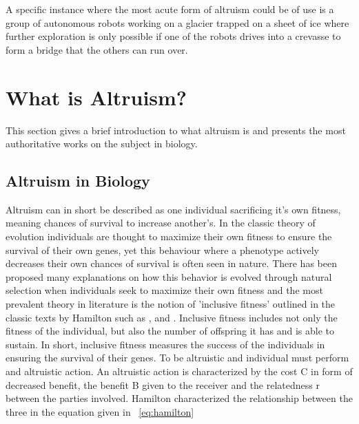 \documentclass[a4paper]{book}
\begin{document}
  
A specific instance where the most acute form of altruism could be of use is a group of autonomous robots working on a  glacier trapped on a sheet of ice where further exploration is only possible if one of the robots drives into a crevasse to form a bridge that the others can run over.    


\section{What is Altruism?}\label{cit}
\label{sec:BackgroundAndMotivation}
This section gives a brief introduction to what altruism is and presents the most authoritative works on the subject in biology.

\subsection{Altruism in Biology}

Altruism can in short be described as one individual sacrificing it's own fitness, meaning chances of survival to increase another's.
In the classic theory of evolution individuals are thought to maximize their own fitness to ensure the survival of their own genes, yet this behaviour where a phenotype actively decreases their own chances of survival is often seen in nature.
There has been proposed many explanations on how this behavior is evolved through natural selection when individuals seek to maximize their own fitness and the most prevalent theory in literature is the notion of 'inclusive fitness' outlined in the classic texts by Hamilton such as \cite{w._d._hamilton_evolution_1963}, \cite{hamilton_genetical_1964-1} and \cite{hamilton_genetical_1964}.
Inclusive fitness includes not only the fitness of the individual, but also the number of offspring it has and is able to sustain. In short, inclusive fitness measures the success of the individuals in ensuring the survival of their genes. 
To be altruistic and individual must perform and altruistic action. 
An altruistic action is characterized by the cost C in form of decreased benefit, the benefit B given to the receiver and the relatedness r between the parties involved. Hamilton characterized the relationship between the three in the equation given in ~\ref{eq:hamilton}
\end{document}
